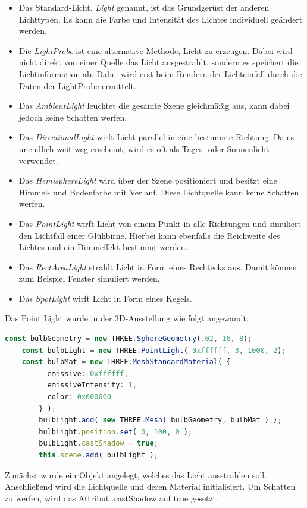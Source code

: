 \begin{itemize}
    \item Das Standard-Licht, \emph{Light} genannt, ist das Grundgerüst der anderen Lichttypen. Es kann die Farbe und Intensität des Lichtes individuell geändert werden. \cite{StandardLight}
    \item Die \emph{LightProbe} ist eine alternative Methode, Licht zu erzeugen. Dabei wird nicht direkt von einer Quelle das Licht ausgestrahlt, sondern es speichert die Lichtinformation ab. Dabei wird erst beim Rendern der Lichteinfall durch die Daten der LightProbe ermittelt.  \cite{LightProbe}
    \item Das \emph{AmbientLight} leuchtet die gesamte Szene gleichmäßig aus, kann dabei jedoch keine Schatten werfen. \cite{AmbientLight}
    \item Das \emph{DirectionalLight} wirft Licht parallel in eine bestimmte Richtung. Da es unendlich weit weg erscheint, wird es oft als Tages- oder Sonnenlicht verwendet. \cite{DirectionalLight}
    \item Das \emph{HemisphereLight} wird über der Szene positioniert und besitzt eine Himmel- und Bodenfarbe mit Verlauf. Diese Lichtquelle kann keine Schatten werfen. \cite{HemisphereLight}
    \item Das \emph{PointLight} wirft Licht von einem Punkt in alle Richtungen und simuliert den Lichtfall einer Glühbirne. Hierbei kann ebenfalls die Reichweite des Lichtes und ein Dimmeffekt bestimmt werden. \cite{PointLight}
    \item Das \emph{RectAreaLight} strahlt Licht in Form eines Rechtecks aus. Damit können zum Beispiel Fenster simuliert werden. \cite{ReactAreaLight}
    \item Das \emph{SpotLight} wirft Licht in Form eines Kegels. \cite{SpotLight}
\end{itemize}

Das Point Light wurde in der 3D-Ausstellung wie folgt angewandt:  
\begin{lstlisting}[caption={Lichtsetzung in der 3D-Ausstellung},language=TypeScript,label=lst:impl:pointlight]
    const bulbGeometry = new THREE.SphereGeometry(.02, 16, 8);
    const bulbLight = new THREE.PointLight( 0xffffff, 3, 1000, 2); 
    const bulbMat = new THREE.MeshStandardMaterial( {
          emissive: 0xffffff,
          emissiveIntensity: 1,
          color: 0x000000
        } );
        bulbLight.add( new THREE.Mesh( bulbGeometry, bulbMat ) );
        bulbLight.position.set( 0, 100, 0 );
        bulbLight.castShadow = true;
        this.scene.add( bulbLight );
\end{lstlisting}
Zunächst wurde ein Objekt angelegt, welches das Licht ausstrahlen soll. Anschließend wird die Lichtquelle und deren Material initialisiert. Um Schatten zu werfen, wird das Attribut .castShadow auf true gesetzt. 

